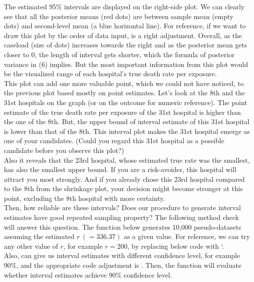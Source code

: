 \documentclass[article]{jss}
\begin{document}
The estimated 95\% intervals are displayed on the right-side plot. We can clearly see that all the posterior means (red dots) are between sample mean (empty dots) and second-level mean (a blue horizontal line). For reference, if we want to draw this plot by the order of data input,  is a right adjustment. Overall, as the caseload (size of dots) increases towards the right and as the posterior mean gets closer to 0, the length of interval gets shorter, which the formula of posterior variance in (6) implies. But the most important information from this plot would be the visualized range of each hospital's true death rate per exposure. 
\\

This plot can add one more valuable point, which we could not have noticed, to the previous plot based mostly on point estimates. Let's look at the 8th and the 31st hospitals on the graph (or on the outcome for numeric reference). The point estimate of the true death rate per exposure of the 31st hospital is higher than the one of the 8th. But, the upper bound of interval estimate of this 31st hospital is lower than that of the 8th. This interval plot makes the 31st hospital emerge as one of your candidates. (Could you regard this 31st hospital as a possible candidate before you observe this plot?)
\\

Also it reveals that the 23rd hospital, whose estimated true rate was the smallest, has also the smallest upper bound. If you are a risk-avoider, this hospital will attract you most strongly. And if you already chose this 23rd hospital compared to the 8th from the shrinkage plot, your decision might become stronger at this point, excluding the 8th hospital with more certainty. 
\\

Then, how reliable are these intervals? Does our procedure to generate interval estimates have good repeated sampling property? The following method check will answer this question. The  function below generates 10,000 pseudo-datasets assuming the estimated $r~(=336.37)$ as a given value. For reference, we can try any other value of $r$, for example $r=200$, by replacing below code with `.
\\

Also,  can give us interval estimates with different confidence level, for example 90\%,  and the appropriate code adjustment is .  Then, the function  will evaluate whether interval estimates achieve 90\% confidence level.
\\
\end{document}
